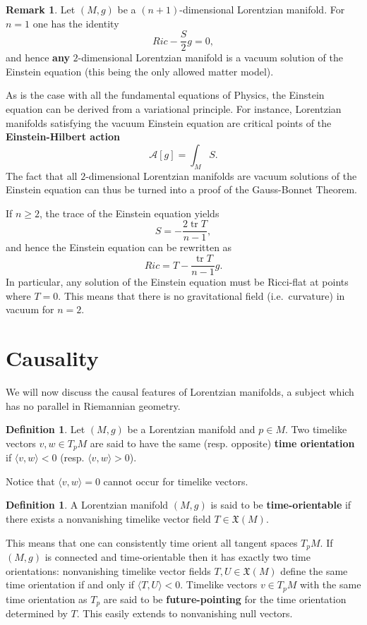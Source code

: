 \documentclass[12pt]{amsart}
\newcommand{\tr}{\operatorname{tr}}
\newcommand{\cX}{\mathfrak{X}}
\theoremstyle{definition}
\newtheorem{Def}[Thm]{Definition}
\newtheorem{Remark}[Thm]{Remark}
\theoremstyle{remark}
\begin{document}
\begin{Remark}
Let $(M,g)$ be a $(n+1)$-dimensional Lorentzian manifold. For $n=1$ one has the identity
\[
Ric - \frac{S}2 g = 0,
\]
and hence {\bf any} $2$-dimensional Lorentzian manifold is a vacuum solution of the Einstein equation (this being the only allowed matter model).

As is the case with all the fundamental equations of Physics, the Einstein equation can be derived from a variational principle. For instance, Lorentzian manifolds satisfying the vacuum Einstein equation are critical points of the {\bf Einstein-Hilbert action}
\[
\mathcal{A}[g] = \int_M S.
\]
The fact that all $2$-dimensional Lorentzian manifolds are vacuum solutions of the Einstein equation can thus be turned into a proof of the Gauss-Bonnet Theorem.

If $n \geq 2$, the trace of the Einstein equation  yields
\[
S = - \frac{2 \tr T}{n-1},
\]
and hence the Einstein equation can be rewritten as
\[
Ric = T - \frac{\tr T}{n-1} g.
\]
In particular, any solution of the Einstein equation must be Ricci-flat at points where $T=0$. This means that there is no gravitational field (i.e.~curvature) in vacuum for $n=2$.
\end{Remark}
%
%
\section{Causality}
%
We will now discuss the causal features of Lorentzian manifolds, a subject which has no parallel in Riemannian geometry. 

\begin{Def}
Let $(M,g)$ be a Lorentzian manifold and $p \in M$. Two timelike vectors $v,w \in T_pM$ are said to have the same (resp. opposite) {\bf time orientation} if $\langle v, w \rangle < 0$ (resp. $\langle v, w \rangle > 0$).
\end{Def}

Notice that $\langle v, w \rangle = 0$ cannot occur for timelike vectors.

\begin{Def}
A Lorentzian manifold $(M,g)$ is said to be {\bf time-orientable} if there exists a nonvanishing timelike vector field $T\in\cX(M)$.
\end{Def}

This means that one can consistently time orient all tangent spaces $T_pM$. If $(M,g)$ is connected and time-orientable then it has exactly two time orientations: nonvanishing timelike vector fields $T,U \in\cX(M)$ define the same time orientation if and only if $\langle T, U \rangle < 0$. Timelike vectors $v \in T_pM$ with the same time orientation as $T_p$ are said to be {\bf future-pointing} for the time orientation determined by $T$. This easily extends to nonvanishing null vectors.
\end{document}
